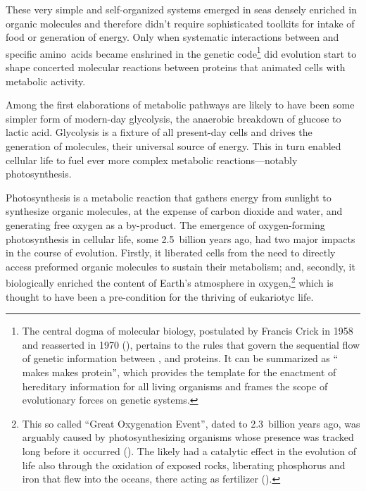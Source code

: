 \documentclass{tufte-book}
\begin{document}
These very simple and \mbox{self-organized} systems emerged in seas densely
enriched in organic molecules and therefore didn't require sophisticated
toolkits for intake of food or generation of energy.  Only when systematic
interactions between  and specific amino~acids became enshrined
in the genetic code\footnote{The central dogma of molecular biology, postulated
  by Francis Crick in 1958 and reasserted in 1970
  (\citealp{crick_protein_1958,crick_central_1970}), pertains to the rules that
  govern the sequential flow of genetic information between ,
   and proteins. It can be summarized as `` makes
   makes protein'', which provides the template for the enactment
  of hereditary information for all living organisms and frames the scope of
  evolutionary forces on genetic systems.} did evolution start to shape
concerted molecular reactions between proteins that animated cells with
metabolic activity.

Among the first elaborations of metabolic pathways are likely to have been some
simpler form of \mbox{modern-day} glycolysis, the anaerobic breakdown of glucose
to lactic acid.  Glycolysis is a fixture of all \mbox{present-day} cells and
drives the generation of  molecules, their universal source of
energy.  This in turn enabled cellular life to fuel ever more complex metabolic
reactions---notably photosynthesis.

Photosynthesis is a metabolic reaction that gathers energy from sunlight to
synthesize organic molecules, at the expense of carbon dioxide and water, and
generating free oxygen as a \mbox{by-product}.  The emergence of
\mbox{oxygen-forming} photosynthesis in cellular life, some 2.5~billion years
ago, had two major impacts in the course of evolution.  Firstly, it liberated
cells from the need to directly access preformed organic molecules to sustain
their metabolism; and, secondly, it biologically enriched the content of Earth's
atmosphere in oxygen,\footnote{This so called ``Great Oxygenation Event'', dated
  to 2.3~billion years ago, was arguably caused by photosynthesizing organisms
  whose presence was tracked long before it occurred
  (\citealp{flannery_archean_2012}). The  likely had a catalytic
  effect in the evolution of life also through the oxidation of exposed rocks,
  liberating phosphorus and iron that flew into the oceans, there acting as
  fertilizer (\citealp{zimmer_mystery_2013}).} which is thought to have been a
\mbox{pre-condition} for the thriving of eukariotyc life.
\end{document}
